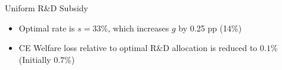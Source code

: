 \documentclass[
  aspectratio=169,  %
  handout           %
]{beamer}
\theoremstyle{plain}
\begin{document}
\begin{frame}{Uniform R\&D Subsidy \hyperlink{optimal}{}}
  \begin{center}
    \begin{figure}
      \centering{}\setcounter{subfigure}{0}
    \end{figure}
    \par\end{center}
  \begin{itemize}
    \item Optimal rate is $s=33\%$, which increases $g$ by 0.25 pp (14\%)
    \item CE Welfare loss relative to optimal R\&D allocation is reduced to
          $0.1\%$ (Initially $0.7\%$)
  \end{itemize}
\end{frame}
%
\end{document}
